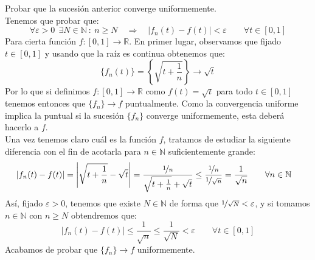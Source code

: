 \begin{ejercicio}
    Probar que la sucesión anterior converge uniformemente.\\

    \noindent
    Tenemos que probar que:
    \begin{equation*}
        \forall \varepsilon>0~~\exists N\in \mathbb{N}~:~n\geq N \quad\Longrightarrow\quad |f_n(t) - f(t)| < \varepsilon \qquad \forall t\in [0,1]
    \end{equation*}
    Para cierta función $f:[0,1]\to \mathbb{R}$. En primer lugar, observamos que fijado $t\in [0,1]$ y usando que la raíz es continua obtenemos que:
    \begin{equation*}
        \{f_n(t)\} = \left\{\sqrt{t+\frac{1}{n}}\right\} \to \sqrt{t}
    \end{equation*}
    Por lo que si definimos $f:[0,1]\to \mathbb{R}$ como $f(t) = \sqrt{t}$ para todo $t\in [0,1]$ tenemos entonces que $\{f_n\}\to f$ puntualmente. Como la convergencia uniforme implica la puntual si la sucesión $\{f_n\}$ converge uniformemente, esta deberá hacerlo a $f$.\\

    \noindent
    Una vez tenemos claro cuál es la función $f$, tratamos de estudiar la siguiente diferencia con el fin de acotarla para $n\in \mathbb{N}$ suficientemente grande:
    \begin{align*}
        |f_n(t) - f(t)| &= \left|\sqrt{t+\frac{1}{n}}-\sqrt{t}\right| = \frac{\nicefrac{1}{n}}{\sqrt{t+\frac{1}{n}} + \sqrt{t}} \leq \frac{\nicefrac{1}{n}}{\nicefrac{1}{\sqrt{n}}} = \frac{1}{\sqrt{n}} \qquad \forall n\in \mathbb{N}
    \end{align*}
    Así, fijado $\varepsilon>0$, tenemos que existe $N\in \mathbb{N}$ de forma que $\nicefrac{1}{\sqrt{N}}< \varepsilon$, y si tomamos $n\in \mathbb{N}$ con $n\geq N$ obtendremos que:
    \begin{equation*}
        |f_n(t) - f(t)| \leq \frac{1}{\sqrt{n}} \leq \frac{1}{\sqrt{N}} < \varepsilon \qquad \forall t\in [0,1]
    \end{equation*}
    Acabamos de probar que $\{f_n\}\to f$ uniformemente.\\


\end{ejercicio}
